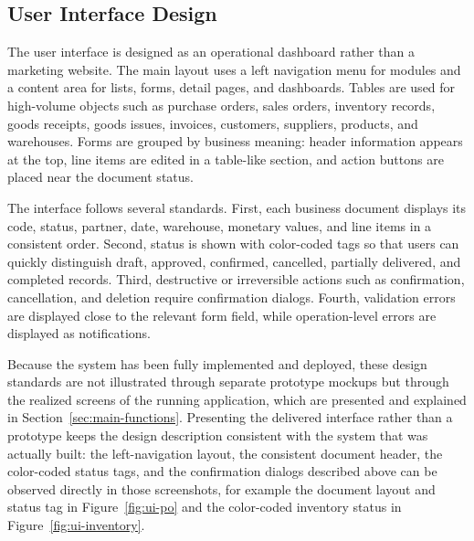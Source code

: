 \subsection{User Interface Design}
The user interface is designed as an operational dashboard rather than a
marketing website. The main layout uses a left navigation menu for modules and a
content area for lists, forms, detail pages, and dashboards. Tables are used for
high-volume objects such as purchase orders, sales orders, inventory records,
goods receipts, goods issues, invoices, customers, suppliers, products, and
warehouses. Forms are grouped by business meaning: header information appears at
the top, line items are edited in a table-like section, and action buttons are
placed near the document status.

The interface follows several standards. First, each business document displays
its code, status, partner, date, warehouse, monetary values, and line items in a
consistent order. Second, status is shown with color-coded tags so that users can
quickly distinguish draft, approved, confirmed, cancelled, partially delivered,
and completed records. Third, destructive or irreversible actions such as
confirmation, cancellation, and deletion require confirmation dialogs. Fourth,
validation errors are displayed close to the relevant form field, while
operation-level errors are displayed as notifications.

Because the system has been fully implemented and deployed, these design standards
are not illustrated through separate prototype mockups but through the realized
screens of the running application, which are presented and explained in
Section~\ref{sec:main-functions}. Presenting the delivered interface rather than a
prototype keeps the design description consistent with the system that was actually
built: the left-navigation layout, the consistent document header, the color-coded
status tags, and the confirmation dialogs described above can be observed directly
in those screenshots, for example the document layout and status tag in
Figure~\ref{fig:ui-po} and the color-coded inventory status in
Figure~\ref{fig:ui-inventory}.

